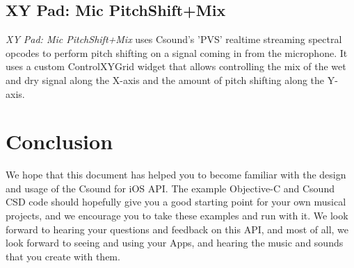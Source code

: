 \documentclass[11pt]{article}
\begin{document}
\subsection{XY Pad: Mic PitchShift+Mix}

\emph{XY Pad: Mic PitchShift+Mix} uses Csound's 'PVS' realtime streaming spectral opcodes to perform pitch shifting on a signal coming in from the microphone.  It uses a custom ControlXYGrid widget that allows controlling the mix of the wet and dry signal along the X-axis and the amount of pitch shifting along the Y-axis.


\section{Conclusion}

We hope that this document has helped you to become familiar with the design and usage of the Csound for iOS API. The example Objective-C and Csound CSD code should hopefully give you a good starting point for your own musical projects, and we encourage you to take these examples and run with it.  We look forward to hearing your questions and feedback on this API, and most of all, we look forward to seeing and using your Apps, and hearing the music and sounds that you create with them.
\end{document}
